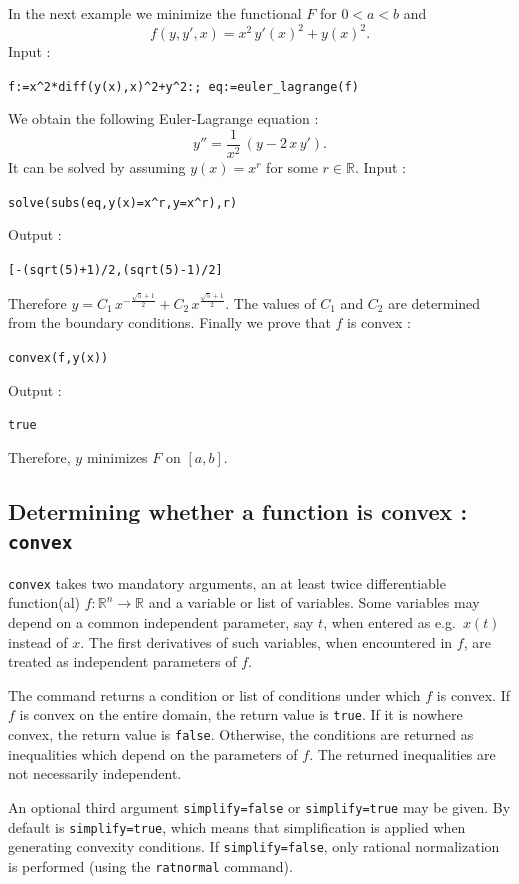 \documentclass[a4paper,11pt]{book}
\begin{document}
In the next example we minimize the functional $F$ for $0<a<b$ and
\[ f(y,y',x)=x^2\,y'(x)^2+y(x)^2. \]
Input :
\begin{center}
  \tt f:=x\verb|^|2*diff(y(x),x)\verb|^|2+y\verb|^|2:; eq:=euler\_lagrange(f)
\end{center}
We obtain the following Euler-Lagrange equation :
\[ y''=\frac{1}{x^2}\,(y-2\,x\,y'). \]
It can be solved by assuming $y(x)=x^r$ for some $r\in\mathbb{R}$. Input :
\begin{center}
  \tt solve(subs(eq,y(x)=x\verb|^|r,y=x\verb|^|r),r)
\end{center}
Output :
\begin{center}
  \tt [-(sqrt(5)+1)/2,(sqrt(5)-1)/2]
\end{center}
Therefore $y=C_1\,x^{-\frac{\sqrt{5}+1}{2}}+C_2\,x^{\frac{\sqrt{5}+1}{2}}$. The values of $C_1$ and $C_2$ are determined from the boundary conditions. Finally we prove that $f$ is convex :
\begin{center}
  \tt convex(f,y(x))
\end{center}
Output :
\begin{center}
  \tt true
\end{center}
Therefore, $y$ minimizes $F$ on $[a,b]$.

\subsection{Determining whether a function is convex : {\tt convex}}
{\tt convex} takes two mandatory arguments, an at least twice differentiable function(al) $f:\mathbb{R}^n\to\mathbb{R}$ and a variable or list of variables. Some variables may depend on a common independent parameter, say $t$, when entered as e.g.~$x(t)$ instead of $x$. The first derivatives of such variables, when encountered in $f$, are treated as independent parameters of $f$.

The command returns a condition or list of conditions under which $f$ is convex. If $f$ is convex on the entire domain, the return value is {\tt true}. If it is nowhere convex, the return value is {\tt false}. Otherwise, the conditions are returned as inequalities which depend on the parameters of $f$. The returned inequalities are not necessarily independent.

An optional third argument {\tt simplify=false} or {\tt simplify=true} may be given. By default is {\tt simplify=true}, which means that simplification is applied when generating convexity conditions. If {\tt simplify=false}, only rational normalization is performed (using the {\tt ratnormal} command).
\end{document}
